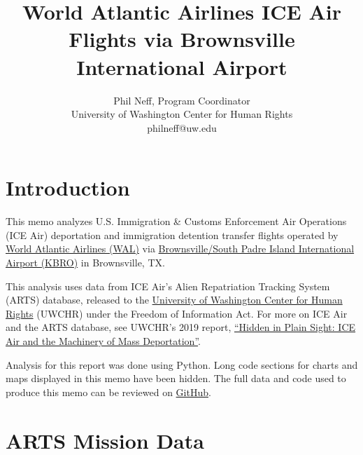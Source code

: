 \documentclass[a4paper,11pt,final]{article}
\begin{document}
\title{World Atlantic Airlines ICE Air Flights via Brownsville International Airport}\author{Phil Neff, Program Coordinator\\University of Washington Center for Human Rights\\philneff@uw.edu}\maketitle

\section{Introduction}

This memo analyzes U.S. Immigration \& Customs Enforcement Air
Operations (ICE Air) deportation and immigration detention transfer
flights operated by \href{https://www.flywaa.com/\#tf-home}{World
Atlantic Airlines (WAL)} via
\href{https://www.airnav.com/airport/KBRO}{Brownsville/South Padre
Island International Airport (KBRO)} in Brownsville, TX.

This analysis uses data from ICE Air's Alien Repatriation Tracking
System (ARTS) database, released to the
\href{https://jsis.washington.edu/humanrights/}{University of Washington
Center for Human Rights} (UWCHR) under the Freedom of Information Act.
For more on ICE Air and the ARTS database, see UWCHR's 2019 report,
\href{https://jsis.washington.edu/humanrights/2019/04/23/ice-air/}{``Hidden
in Plain Sight: ICE Air and the Machinery of Mass Deportation''}.

Analysis for this report was done using Python. Long code sections for
charts and maps displayed in this memo have been hidden. The full data
and code used to produce this memo can be reviewed on
\href{https://github.com/UWCHR/ice-air/tree/master/installment2/write/src}{GitHub}.

\section{ARTS Mission Data}
\end{document}
